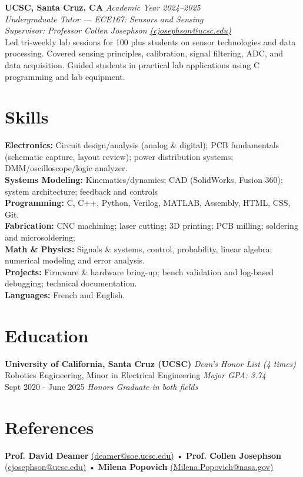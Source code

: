 \documentclass[a4paper,9pt]{article}
\begin{document}
\textbf{UCSC, Santa Cruz, CA} \hfill \textit{Academic Year 2024--2025} \\
\textit{Undergraduate Tutor — ECE167: Sensors and Sensing } \\
\textit{Supervisor: Professor Collen Josephson \href{mailto:cjosephson@ucsc.edu}{(cjosephson@ucsc.edu)}} \\[0.3em]
Led tri-weekly lab sessions for 100 plus students on sensor technologies and data processing. Covered sensing principles, calibration, signal filtering, ADC, and data acquisition. Guided students in practical lab applications using C programming and lab equipment.

\section*{Skills}
\textbf{Electronics:} Circuit design/analysis (analog \& digital); PCB fundamentals (schematic capture, layout review); power distribution systems; DMM/oscilloscope/logic analyzer. \\
\textbf{Systems Modeling:} Kinematics/dynamics; CAD (SolidWorks, Fusion 360); system architecture; feedback and controls \\
\textbf{Programming:} C, C++, Python, Verilog, MATLAB, Assembly, HTML, CSS, Git.\\
\textbf{Fabrication:} CNC machining; laser cutting; 3D printing; PCB milling; soldering and microsoldering;\\
\textbf{Math \& Physics:} Signals \& systems, control, probability, linear algebra; numerical modeling and error analysis. \\
\textbf{Projects:} Firmware \& hardware bring-up; bench validation and log-based debugging; technical documentation. \\
\textbf{Languages:} French and English.

\section*{Education}
\small
\textbf{University of California, Santa Cruz (UCSC)} \hfill \textit{Dean's Honor List (4 times)} \\
Robotics Engineering, Minor in Electrical Engineering \hfill \textit{Major GPA: 3.74} \\
Sept 2020 - June 2025 \hfill \textit{Honors Graduate in both fields}

\section*{References}
\footnotesize
\textbf{Prof. David Deamer} \href{mailto:deamer@soe.ucsc.edu}{(deamer@soe.ucsc.edu)} • \textbf{Prof. Collen Josephson} \href{mailto:cjosephson@ucsc.edu}{(cjosephson@ucsc.edu)} • \textbf{Milena Popovich} \href{mailto:Milena.Popovich@nasa.gov}{(Milena.Popovich@nasa.gov)}
\end{document}
